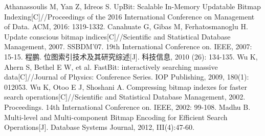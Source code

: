 \documentclass[11pt, a4paper]{article}
\begin{document}
\renewcommand\refname{参考文献}
\begin{thebibliography}{99}
Athanassoulis M, Yan Z, Idreos S. UpBit: Scalable In-Memory Updatable Bitmap Indexing[C]//Proceedings of the 2016 International Conference on Management of Data. ACM, 2016: 1319-1332.
Canahuate G, Gibas M, Ferhatosmanoglu H. Update conscious bitmap indices[C]//Scientific and Statistical Database Management, 2007. SSBDM'07. 19th International Conference on. IEEE, 2007: 15-15.
程鹏. 位图索引技术及其研究综述[J]. 科技信息, 2010 (26): 134-135.
Wu K, Ahern S, Bethel E W, et al. FastBit: interactively searching massive data[C]//Journal of Physics: Conference Series. IOP Publishing, 2009, 180(1): 012053.
Wu K, Otoo E J, Shoshani A. Compressing bitmap indexes for faster search operations[C]//Scientific and Statistical Database Management, 2002. Proceedings. 14th International Conference on. IEEE, 2002: 99-108.
Madhu B. Multi-level and Multi-component Bitmap Encoding for Efficient Search Operations[J]. Database Systems Journal, 2012, III(4):47-60.

\end{thebibliography}
\end{document}
